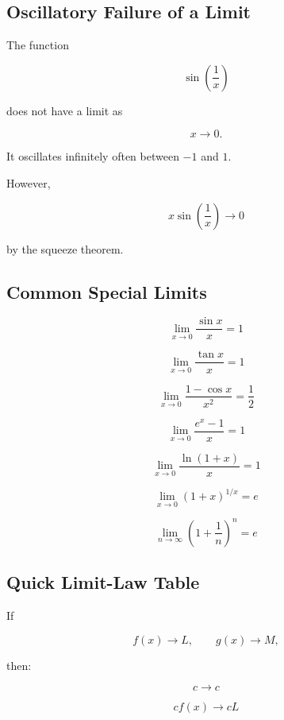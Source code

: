 \subsection{Oscillatory Failure of a Limit}
\label{subsec:oscillatory-limit-failure}

The function

\[
\boxed{
\sin\left(\frac1x\right)
}
\]

does not have a limit as

\[
x\to0.
\]

It oscillates infinitely often between \(-1\) and \(1\).

However,

\[
x\sin\left(\frac1x\right)
\to0
\]

by the squeeze theorem.

\subsection{Common Special Limits}
\label{subsec:common-special-limits-table}

\[
\boxed{
\lim_{x\to0}
\frac{\sin x}{x}
=
1
}
\]

\[
\boxed{
\lim_{x\to0}
\frac{\tan x}{x}
=
1
}
\]

\[
\boxed{
\lim_{x\to0}
\frac{1-\cos x}{x^2}
=
\frac12
}
\]

\[
\boxed{
\lim_{x\to0}
\frac{e^x-1}{x}
=
1
}
\]

\[
\boxed{
\lim_{x\to0}
\frac{\ln(1+x)}{x}
=
1
}
\]

\[
\boxed{
\lim_{x\to0}
(1+x)^{1/x}
=
e
}
\]

\[
\boxed{
\lim_{n\to\infty}
\left(
1+\frac1n
\right)^n
=
e
}
\]

\subsection{Quick Limit-Law Table}
\label{subsec:quick-limit-law-table}

If

\[
f(x)\to L,
\qquad
g(x)\to M,
\]

then:

\[
\boxed{
c
\to
c
}
\]

\[
\boxed{
cf(x)
\to
cL
}
\]

